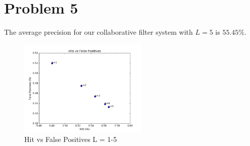 \documentclass[12pt]{article}
\begin{document}
\section*{Problem 5}
The average precision for our collaborative filter system with $L = 5$ is $55.45\%$.
\begin{figure}[h]
\centering
\includegraphics[width=0.55\textwidth]{graphs/problem5}
\caption{Hit vs False Positives L = 1-5}
\end{figure}
\end{document}
